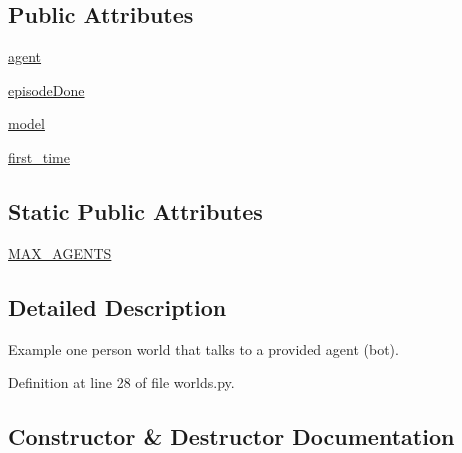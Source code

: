 \subsection*{Public Attributes}
\begin{DoxyCompactItemize}
\item 
\hyperlink{classparlai_1_1chat__service_1_1tasks_1_1chatbot_1_1worlds_1_1MessengerBotChatTaskWorld_aaf90973d4719a52bdf62d221d044399e}{agent}
\item 
\hyperlink{classparlai_1_1chat__service_1_1tasks_1_1chatbot_1_1worlds_1_1MessengerBotChatTaskWorld_a1dd84854cb60115df100f9a5610c4270}{episode\+Done}
\item 
\hyperlink{classparlai_1_1chat__service_1_1tasks_1_1chatbot_1_1worlds_1_1MessengerBotChatTaskWorld_aacaa2c91e062e4c8c2213391a40565f4}{model}
\item 
\hyperlink{classparlai_1_1chat__service_1_1tasks_1_1chatbot_1_1worlds_1_1MessengerBotChatTaskWorld_aeb63eec75493b0fb271a72a6425c81d8}{first\+\_\+time}
\end{DoxyCompactItemize}
\subsection*{Static Public Attributes}
\begin{DoxyCompactItemize}
\item 
\hyperlink{classparlai_1_1chat__service_1_1tasks_1_1chatbot_1_1worlds_1_1MessengerBotChatTaskWorld_a94ff3eb56a4159b0ad2b5f74c3b011fd}{M\+A\+X\+\_\+\+A\+G\+E\+N\+TS}
\end{DoxyCompactItemize}


\subsection{Detailed Description}
\begin{DoxyVerb}Example one person world that talks to a provided agent (bot).
\end{DoxyVerb}
 

Definition at line 28 of file worlds.\+py.



\subsection{Constructor \& Destructor Documentation}
\mbox{\label{classparlai_1_1chat__service_1_1tasks_1_1chatbot_1_1worlds_1_1MessengerBotChatTaskWorld_a5e7d694f09fe64607a3e0c8b19e5e893}} 
